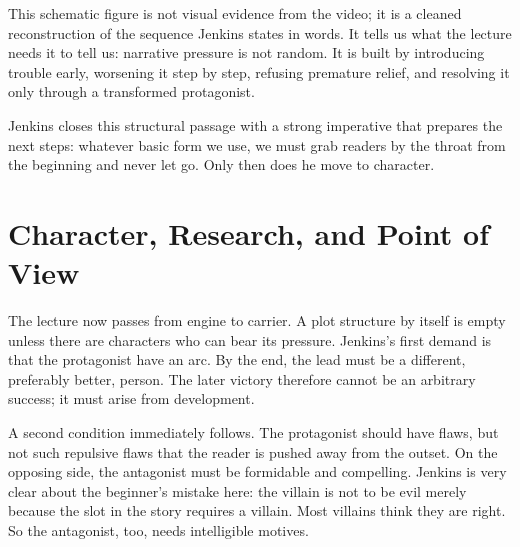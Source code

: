 \begin{figure}
\centering
{}%
\end{figure}

This schematic figure is not visual evidence from the video; it is a cleaned reconstruction of the sequence Jenkins states in words. It tells us what the lecture needs it to tell us: narrative pressure is not random. It is built by introducing trouble early, worsening it step by step, refusing premature relief, and resolving it only through a transformed protagonist.

Jenkins closes this structural passage with a strong imperative that prepares the next steps: whatever basic form we use, we must grab readers by the throat from the beginning and never let go. Only then does he move to character.

\section{Character, Research, and Point of View}

The lecture now passes from engine to carrier. A plot structure by itself is empty unless there are characters who can bear its pressure. Jenkins's first demand is that the protagonist have an arc. By the end, the lead must be a different, preferably better, person. The later victory therefore cannot be an arbitrary success; it must arise from development.

A second condition immediately follows. The protagonist should have flaws, but not such repulsive flaws that the reader is pushed away from the outset. On the opposing side, the antagonist must be formidable and compelling. Jenkins is very clear about the beginner's mistake here: the villain is not to be evil merely because the slot in the story requires a villain. Most villains think they are right. So the antagonist, too, needs intelligible motives.

